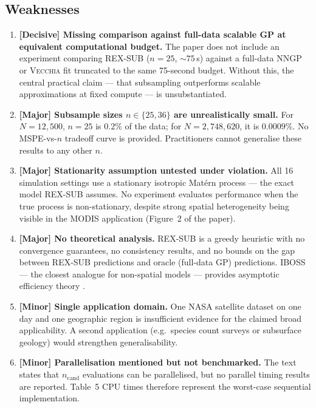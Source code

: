 \documentclass[12pt, a4paper]{article}
\newcommand{\Vecchia}{\textsc{Vecchia}}
\begin{document}
\subsection{Weaknesses}

\begin{enumerate}[label=\textbf{W\arabic*.}, leftmargin=2.5em]
  \item \textbf{[Decisive] Missing comparison against full-data scalable GP at
    equivalent computational budget.}  The paper does not include an experiment
    comparing REX-SUB ($n=25$, ${\sim}75$\,s) against a full-data NNGP or \Vecchia{}
    fit truncated to the same 75-second budget.  Without this, the central practical
    claim --- that subsampling outperforms scalable approximations at fixed compute
    --- is unsubstantiated.

  \item \textbf{[Major] Subsample sizes $n \in \{25, 36\}$ are unrealistically
    small.}  For $N = 12{,}500$, $n=25$ is $0.2\%$ of the data; for $N=2{,}748{,}620$,
    it is $0.0009\%$.  No MSPE-vs-$n$ tradeoff curve is provided.  Practitioners
    cannot generalise these results to any other $n$.

  \item \textbf{[Major] Stationarity assumption untested under violation.}  All 16
    simulation settings use a stationary isotropic Matérn process --- the exact model
    REX-SUB assumes.  No experiment evaluates performance when the true process is
    non-stationary, despite strong spatial heterogeneity being visible in the MODIS
    application (Figure~2 of the paper).

  \item \textbf{[Major] No theoretical analysis.}  REX-SUB is a greedy heuristic
    with no convergence guarantees, no consistency results, and no bounds on the
    gap between REX-SUB predictions and oracle (full-data GP) predictions.  IBOSS
    --- the closest analogue for non-spatial models --- provides asymptotic efficiency
    theory \cite{Wang2019}.

  \item \textbf{[Minor] Single application domain.}  One NASA satellite dataset on
    one day and one geographic region is insufficient evidence for the claimed broad
    applicability.  A second application (e.g.\ species count surveys or subsurface
    geology) would strengthen generalisability.

  \item \textbf{[Minor] Parallelisation mentioned but not benchmarked.}
    The text states that $n_\text{cand}$ evaluations can be parallelised, but
    no parallel timing results are reported.  Table~5 CPU times therefore represent
    the worst-case sequential implementation.
\end{enumerate}
\end{document}

